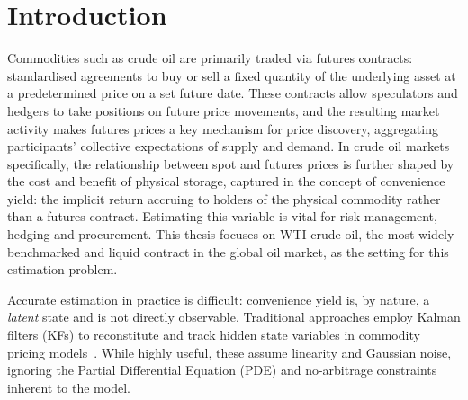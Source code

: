 \documentclass[sigconf, authorversion=true, nonacm=true]{acmart}
\begin{document}

\maketitle

\section{Introduction}
\label{sec:introduction}

Commodities such as crude oil are primarily traded via futures contracts: standardised agreements to buy or sell a fixed quantity of the underlying asset at a predetermined price on a set future date. These contracts allow speculators and hedgers to take positions on future price movements, and the resulting market activity makes futures prices a key mechanism for price discovery, aggregating participants' collective expectations of supply and demand. In crude oil markets specifically, the relationship between spot and futures prices is further shaped by the cost and benefit of physical storage, captured in the concept of convenience yield: the implicit return accruing to holders of the physical commodity rather than a futures contract. Estimating this variable is vital for risk management, hedging and procurement. This thesis focuses on WTI crude oil, the most widely benchmarked and liquid contract in the global oil market, as the setting for this estimation problem.

Accurate estimation in practice is difficult: convenience yield is, by nature, a \textit{latent} state and is not directly observable. Traditional approaches employ Kalman filters (KFs) to reconstitute and track hidden state variables in commodity pricing models~\cite{Schwartz1997TheHedging}. While highly useful, these assume linearity and Gaussian noise, ignoring the Partial Differential Equation (PDE) and no-arbitrage constraints inherent to the model.
\end{document}
